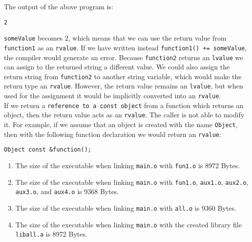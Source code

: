 \documentclass[a4paper]{article}
\newcounter{exerciseCount}
\newcommand{\exercise}[1]{\addtocounter{exerciseCount}{1} \noindent \medskip {\large \textsf{\textbf{Exercise \arabic{exerciseCount} #1}}} \par}
\begin{document}
The output of the above program is:

\begin{verbatim}
2
\end{verbatim}

\verb|someValue| becomes 2, which means that we can use the return value from \verb|function1| as an \verb|rvalue|. If we have written instead \verb|function1() += someValue|, the compiler would generate an error. Because \verb|function2| returns an \verb|lvalue| we can assign to the returned string a different value. We could also assign the return string from \verb|function2| to another string variable, which would make the return type an \verb|rvalue|. However, the return value remains an \verb|lvalue|, but when used for the assignment it would be implicitly converted into an \verb|rvalue|.\\

If we return a \verb|reference to a const object| from a function which returns an object, then the return value acts as an \verb|rvalue|. The caller is not able to modify it. For example, if we assume that an object is created with the name \verb|Object|, then with the following function declaration we would return an \verb|rvalue|:

\begin{verbatim}
Object const &function();
\end{verbatim}

\vspace{1em}

\exercise{} %







\begin{enumerate}
	\item The size of the executable when linking \verb|main.o| with \verb|fun1.o| is 8972 Bytes.
	\item The size of the executable when linking \verb|main.o| with \verb|fun1.o|, \verb|aux1.o|, \verb|aux2.o|, \verb|aux3.o|, and \verb|aux4.o| is 9368 Bytes.
	\item The size of the executable when linking \verb|main.o| with \verb|all.o| is 9360 Bytes.
	\item The size of the executable when linking \verb|main.o| with the created library file \verb|liball.a| is 8972 Bytes.
\end{enumerate}
\end{document}
